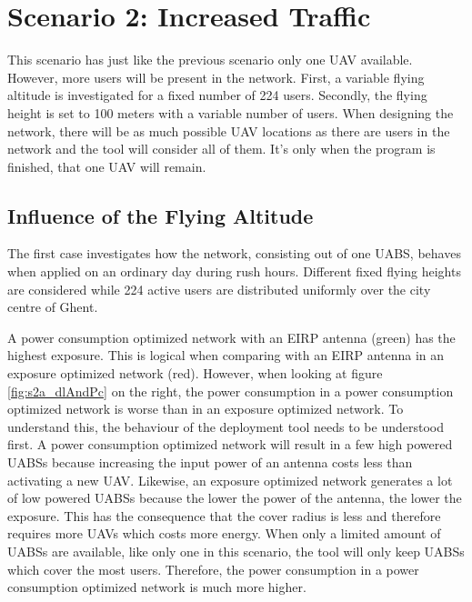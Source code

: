 \FloatBarrier
\section{Scenario 2: Increased Traffic}

This scenario has just like the previous scenario only one \gls{UAV} available. However, more users will be present in the network.
First, a variable flying altitude is investigated for a fixed number of 224 users. 
Secondly, the flying height is set to 100 meters with a variable number of users.
When designing the network, there will be as much possible \gls{UAV} locations as there are users in the network and the tool
will consider all of them. It's only when the program is finished, that one \gls{UAV} will remain.

\subsection{Influence of the Flying Altitude}
The first case investigates how the network, consisting out of one \gls{UABS}, behaves when applied on an ordinary day during rush hours. 
Different fixed flying heights are considered while 224 active users are distributed uniformly over the city centre of Ghent. 

A power consumption optimized network with an \gls{EIRP} antenna (green) has the highest exposure. 
This is logical when comparing with an EIRP antenna in an exposure optimized network (red). 
However, when looking at figure \ref{fig:s2a_dlAndPc} on the right, the power consumption in a power consumption optimized network is worse 
than in an exposure optimized network. To understand this, the behaviour of the deployment tool needs to be understood first. 
A power consumption optimized network will result in a few high powered \gls{UABS}s because increasing the input power of an antenna costs 
less than activating a new  \gls{UAV}. Likewise, an exposure optimized network 
generates a lot of low powered \gls{UABS}s because the lower the power of the antenna, the lower the exposure. This has the consequence that the cover radius 
is less and therefore requires more \gls{UAV}s which costs more energy.
When only a limited amount of \gls{UABS}s are available, 
like only one in this scenario, the tool will only keep \gls{UABS}s which cover the most users. 
Therefore, the power consumption in a power consumption optimized network is much more higher. 


